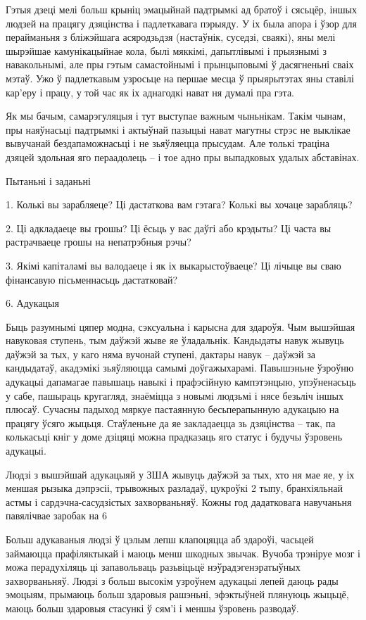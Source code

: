 Гэтыя дзеці мелі больш крыніц эмацыйнай падтрымкі ад братоў і сясьцёр, іншых людзей на працягу дзяцінства і падлеткавага пэрыяду. У іх была апора і ўзор для перайманьня з бліжэйшага асяродзьдзя (настаўнік, суседзі, сваякі), яны мелі шырэйшае камунікацыйнае кола, былі мяккімі, дапытлівымі і прыязнымі з навакольнымі, але пры гэтым самастойнымі і прынцыповымі ў дасягненьні сваіх мэтаў. Ужо ў падлеткавым узросьце на першае месца ў прыярытэтах яны ставілі кар'еру і працу, у той час як іх аднагодкі нават ня думалі пра гэта.

Як мы бачым, самарэгуляцыя і тут выступае важным чыньнікам. Такім чынам, пры наяўнасьці падтрымкі і актыўнай пазыцыі нават магутны стрэс не выклікае вывучанай бездапаможнасьці і не зьяўляецца прысудам. Але толькі траціна дзяцей здольная яго пераадолець – і тое адно пры выпадковых удалых абставінах.

Пытаньні і заданьні

1. Колькі вы зарабляеце? Ці дастаткова вам гэтага? Колькі вы хочаце зарабляць?

2. Ці адкладаеце вы грошы? Ці ёсьць у вас даўгі або крэдыты? Ці часта вы растрачваеце грошы на непатрэбныя рэчы?

3. Якімі капіталамі вы валодаеце і як іх выкарыстоўваеце? Ці лічыце вы сваю фінансавую пісьменнасьць дастатковай?


6. Адукацыя

Быць разумнымі цяпер модна, сэксуальна і карысна для здароўя. Чым вышэйшая навуковая ступень, тым даўжэй жыве яе ўладальнік. Кандыдаты навук жывуць даўжэй за тых, у каго няма вучонай ступені, дактары навук – даўжэй за кандыдатаў, акадэмікі зьяўляюцца самымі доўгажыхарамі. Павышэньне ўзроўню адукацыі дапамагае павышаць навыкі і прафэсійную кампэтэнцыю, упэўненасьць у сабе, пашыраць кругагляд, знаёміцца з новымі людзьмі і нясе безьліч іншых плюсаў. Сучасны падыход мяркуе пастаянную бесьперапынную адукацыю на працягу ўсяго жыцьця. Стаўленьне да яе закладаецца зь дзяцінства – так, па колькасьці кніг у доме дзіцяці можна прадказаць яго статус і будучы ўзровень адукацыі.

Людзі з вышэйшай адукацыяй у ЗША жывуць даўжэй за тых, хто ня мае яе, у іх меншая рызыка дэпрэсіі, трывожных разладаў, цукроўкі 2 тыпу, бранхіяльнай астмы і сардэчна-сасудзістых захворваньняў. Кожны год дадатковага навучаньня павялічвае заробак на 6%

Больш адукаваныя людзі ў цэлым лепш клапоцяцца аб здароўі, часьцей займаюцца прафіляктыкай і маюць менш шкодных звычак. Вучоба трэніруе мозг і можа перадухіляць ці запавольваць разьвіцьцё нэўрадэгенэратыўных захворваньняў. Людзі з больш высокім узроўнем адукацыі лепей даюць рады эмоцыям, прымаюць больш здаровыя рашэньні, эфэктыўней плянуюць жыцьцё, маюць больш здаровыя стасункі ў сям'і і меншы ўзровень разводаў.

